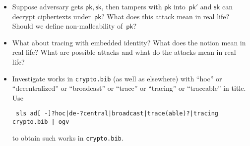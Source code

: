 \begin{itemize}
\item Suppose adversary gets $\mathsf{pk},\mathsf{sk}$, then tampers with $\mathsf{pk}$ into~$\mathsf{pk}'$ and $\mathsf{sk}$ can decrypt ciphertexts under~$\mathsf{pk}$?
What does this attack mean in real life?
Should we define non-malleability of~$\mathsf{pk}$?
\item What about tracing with embedded identity?
What does the notion mean in real life?
What are possible attacks and what do the attacks mean in real life?
\item Investigate works in \texttt{crypto.bib} (as well as elsewhere) with ``\ad hoc'' or ``decentralized'' or ``broadcast'' or ``trace'' or ``tracing'' or ``traceable'' in title. Use
\begin{center}\scriptsize\texttt{
sls {\textquotesingle}ad[ -]?hoc|de-?central|broadcast|trace(able)?|tracing{\textquotesingle} crypto.bib | ogv
}\end{center}
to obtain such works in \texttt{crypto.bib}.
\end{itemize}
